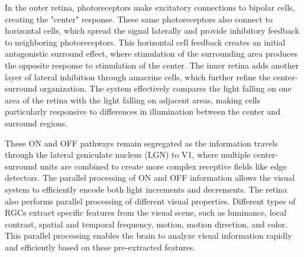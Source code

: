 \begin{figure}[h!]
\begin{tcolorbox}[every float=\centering, drop shadow, title=Center-Surround Receptive Fields ,colback=white,colframe=WMgreen,
  colbacktitle=WMgreen,]
  \label{fig:OnCenterRFs}
 \end{tcolorbox}
\end{figure}
 
 In the outer retina, photoreceptors make excitatory connections to bipolar cells, creating the "center" response. These same photoreceptors also connect to horizontal cells, which spread the signal laterally and provide inhibitory feedback to neighboring photoreceptors. This horizontal cell feedback creates an initial antagonistic surround effect, where stimulation of the surrounding area produces the opposite response to stimulation of the center. The inner retina adds another layer of lateral inhibition through amacrine cells, which further refine the center-surround organization. The system effectively compares the light falling on one area of the retina with the light falling on adjacent areas, making cells particularly responsive to differences in illumination between the center and surround regions.

These ON and OFF pathways remain segregated as the information travels through the lateral geniculate nucleus (LGN) to V1, where multiple center-surround units are combined to create more complex receptive fields like edge detectors. The parallel processing of ON and OFF information allows the visual system to efficiently encode both light increments and decrements. The retina also performs parallel processing of different visual properties. Different types of RGCs extract specific features from the visual scene, such as luminance, local contrast, spatial and temporal frequency, motion, motion direction, and color. This parallel processing enables the brain to analyze visual information rapidly and efficiently based on these pre-extracted features.

